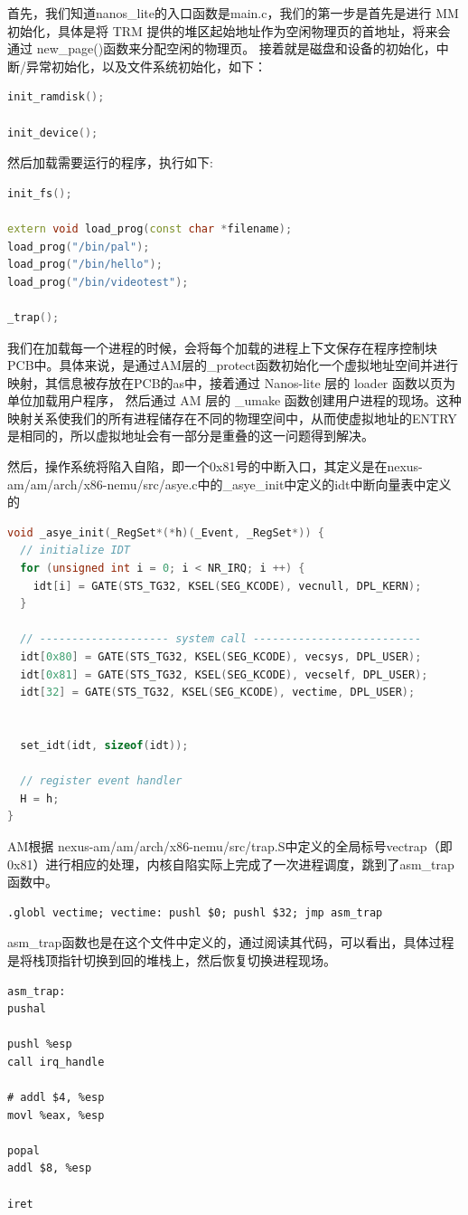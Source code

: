 \documentclass[UTF8,a4paper,10pt]{ctexart}
\begin{document}
首先，我们知道nanos\_lite的入口函数是main.c，我们的第一步是首先是进行 MM 初始化，具体是将 TRM 提供的堆区起始地址作为空闲物理页的首地址，将来会通过 new\_page()函数来分配空闲的物理页。
接着就是磁盘和设备的初始化，中断/异常初始化，以及文件系统初始化，如下：
\begin{lstlisting}[language = C++]
init_ramdisk();

init_device();
\end{lstlisting}

然后加载需要运行的程序，执行如下:
\begin{lstlisting}[language = C++]
init_fs();

extern void load_prog(const char *filename);
load_prog("/bin/pal");
load_prog("/bin/hello");
load_prog("/bin/videotest");

_trap();
\end{lstlisting}

我们在加载每一个进程的时候，会将每个加载的进程上下文保存在程序控制块PCB中。具体来说，是通过AM层的\_protect函数初始化一个虚拟地址空间并进行映射，其信息被存放在PCB的as中，接着通过 Nanos-lite 层的 loader 函数以页为单位加载用户程序， 然后通过 AM 层的 \_umake 函数创建用户进程的现场。这种映射关系使我们的所有进程储存在不同的物理空间中，从而使虚拟地址的ENTRY是相同的，所以虚拟地址会有一部分是重叠的这一问题得到解决。

然后，操作系统将陷入自陷，即一个0x81号的中断入口，其定义是在nexus-am/am/arch/x86-nemu/src/asye.c中的\_asye\_init中定义的idt中断向量表中定义的
\begin{lstlisting}[language = C++]
void _asye_init(_RegSet*(*h)(_Event, _RegSet*)) {
  // initialize IDT
  for (unsigned int i = 0; i < NR_IRQ; i ++) {
    idt[i] = GATE(STS_TG32, KSEL(SEG_KCODE), vecnull, DPL_KERN);
  }

  // -------------------- system call --------------------------
  idt[0x80] = GATE(STS_TG32, KSEL(SEG_KCODE), vecsys, DPL_USER);
  idt[0x81] = GATE(STS_TG32, KSEL(SEG_KCODE), vecself, DPL_USER);
  idt[32] = GATE(STS_TG32, KSEL(SEG_KCODE), vectime, DPL_USER);


  set_idt(idt, sizeof(idt));

  // register event handler
  H = h;
}
\end{lstlisting}
AM根据 nexus-am/am/arch/x86-nemu/src/trap.S中定义的全局标号vectrap（即0x81）进行相应的处理，内核自陷实际上完成了一次进程调度，跳到了asm\_trap函数中。
\begin{lstlisting}
.globl vectime; vectime: pushl $0; pushl $32; jmp asm_trap 
\end{lstlisting}
asm\_trap函数也是在这个文件中定义的，通过阅读其代码，可以看出，具体过程是将栈顶指针切换到回的堆栈上，然后恢复切换进程现场。
\begin{lstlisting}
asm_trap:
pushal

pushl %esp
call irq_handle

# addl $4, %esp
movl %eax, %esp

popal
addl $8, %esp

iret
\end{lstlisting}
\end{document}

